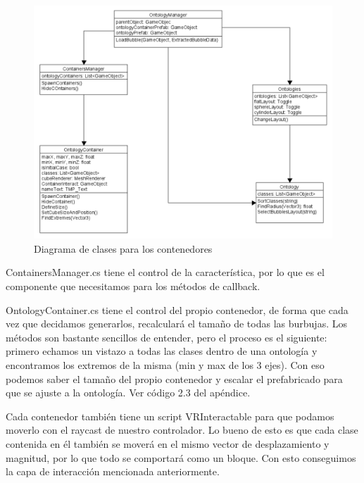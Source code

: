 \begin{figure}[ht]
   \begin{center}
      \includegraphics[width=1\linewidth]{chapter2/figures/containers.png}
   \end{center}
   \caption[Diagrama de clases para los contenedores]
   {\footnotesize Diagrama de clases para los contenedores}
   \label{fig:mufigure16}
\end{figure}

ContainersManager.cs tiene el control de la característica, por lo que es el componente que necesitamos para los métodos de callback.

OntologyContainer.cs tiene el control del propio contenedor, de forma que cada vez que decidamos generarlos, recalculará el tamaño de todas las burbujas. Los métodos son bastante sencillos de entender, pero el proceso es el siguiente: primero echamos un vistazo a todas las clases dentro de una ontología y encontramos los extremos de la misma (min y max de los 3 ejes). Con eso podemos saber el tamaño del propio contenedor y escalar el prefabricado para que se ajuste a la ontología. Ver código 2.3 del apéndice.

Cada contenedor también tiene un script VRInteractable para que podamos moverlo con el raycast de nuestro controlador. Lo bueno de esto es que cada clase contenida en él también se moverá en el mismo vector de desplazamiento y magnitud, por lo que todo se comportará como un bloque. Con esto conseguimos la capa de interacción mencionada anteriormente.

